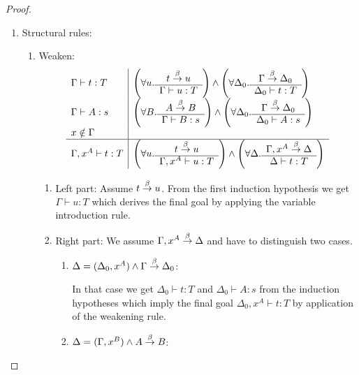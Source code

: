 \begin{theorem}
{\begin{proof}
\begin{enumerate}
            \item Structural rules:
            \begin{enumerate}
                \item Weaken:
                $$
                \begin{array}{l|l}
                \Gamma \vdash t : T
                &
                \left( \forall u. \begin{array}{c} t \stackrel{\beta}{\to} u \\ \hline \Gamma \vdash u: T\end{array} \right)
                \land
                \left( \forall \Delta_0. \begin{array}{c} \Gamma \stackrel{\beta}{\to} \Delta_0 \\ \hline \Delta_0 \vdash t: T\end{array} \right)
                \\
                \Gamma \vdash A : s
                &
                \left( \forall B. \begin{array}{c} A \stackrel{\beta}{\to} B \\ \hline \Gamma \vdash B: s\end{array} \right)
                \land
                \left( \forall \Delta_0. \begin{array}{c} \Gamma \stackrel{\beta}{\to} \Delta_0 \\ \hline \Delta_0 \vdash A: s\end{array} \right)
                \\
                x \notin \Gamma
                \\
                \hline
                \Gamma, x^A \vdash t : T
                &
                \left( \forall u. \begin{array}{c} t \stackrel{\beta}{\to} u \\ \hline \Gamma, x^A \vdash u: T\end{array} \right)
                \land
                \left( \forall \Delta. \begin{array}{c} \Gamma,x^A \stackrel{\beta}{\to} \Delta \\ \hline \Delta \vdash t: T\end{array} \right)
                \end{array}
                $$
                \begin{enumerate}
                    \item Left part: Assume $t \stackrel{\beta}{\to} u$. From the first
                        induction hypothesis we get $\Gamma \vdash u : T$ which
                        derives the final goal by applying the variable
                        introduction rule.

                    \item Right part:
                        We assume $\Gamma,x^A \stackrel{\beta}{\to} \Delta$ and have to
                        distinguish two cases.
                        \begin{enumerate}
                        \item
                            $\Delta = (\Delta_0, x^A)
                            \land \Gamma \stackrel{\beta}{\to} \Delta_0$:

                            In that case we get $\Delta_0 \vdash t : T$ and
                                $\Delta_0 \vdash A : s$ from the induction
                                hypotheses which imply the final goal $\Delta_0,
                                x^A \vdash t : T$ by application of the
                                weakening rule.

                        \item
                            $\Delta = (\Gamma, x^B)
                            \land A \stackrel{\beta}{\to} B$:


\end{enumerate}
\end{enumerate}
\end{enumerate}
\end{enumerate}
\end{proof}}
\end{theorem}
